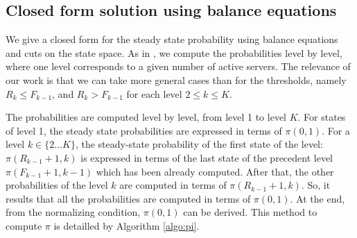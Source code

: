 \documentclass[conference]{IEEEtran}
\begin{document}
\subsection{Closed form solution using balance equations} %
We give a closed form for the steady state probability using balance equations and cuts on the state space.
As in \cite{le2000simple}, we compute the probabilities level by level,
where one level corresponds to a given number of  active servers.
The relevance of our work is that we can take more general cases than \cite{le2000simple} for the thresholds,
namely $R_{k} \leq F_{k-1}$, and  $R_{k} > F_{k-1}$ for each level $2 \leq k \leq K$.

The probabilities are computed level by level, from level 1 to level $K$.
For states of level 1,  the steady state probabilities  are expressed in terms of $\pi(0,1)$. For a level 
$k \in \{2 \ldots K\}$,
the steady-state probability of the  first state of the level: $\pi(R_{k-1}+1,k)$ is expressed in terms of the last state
of the precedent level $\pi(F_{k-1}+1,k-1)$ which has been already computed. After that, the other probabilities of the level
$k$ are computed in terms of $\pi(R_{k-1}+1,k)$. So, it results that all the probabilities  are computed in terms of
$\pi(0,1)$. At the end, from the normalizing condition, $\pi(0,1)$ can be derived.
This method to compute $\pi$ is detailled by Algorithm \ref{algo:pi}.
\end{document}
